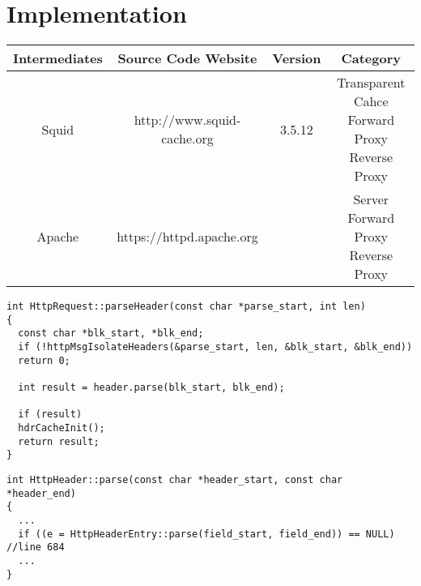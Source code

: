 \newpage
\section{Implementation}

\begin{table}[htbp!]
	\centering
	\renewcommand\arraystretch{1}
	\begin{tabular}{|c|c|c|c|}
		\hline 
		\textbf{ Intermediates} & \textbf{Source Code Website} & \textbf{Version} & \textbf{Category} \\ 
		\hline 
		\hline 
		Squid & http://www.squid-cache.org & 3.5.12 & \makecell{Transparent Cahce\\Forward Proxy\\Reverse Proxy} \\ 
		\hline 
		Apache & https://httpd.apache.org & &\makecell{Server\\ Forward Proxy\\ Reverse Proxy}\\
		\hline
	\end{tabular} 
\end{table}


\begin{lstlisting}[title= squid/src/HttpRequest.cc line:339]
int HttpRequest::parseHeader(const char *parse_start, int len)
{
  const char *blk_start, *blk_end;
  if (!httpMsgIsolateHeaders(&parse_start, len, &blk_start, &blk_end))
  return 0;

  int result = header.parse(blk_start, blk_end);

  if (result)
  hdrCacheInit();
  return result;
}
\end{lstlisting}

\begin{lstlisting}[title=squid/src/HttpHeader.cc line:588]
int HttpHeader::parse(const char *header_start, const char *header_end)
{
  ...
  if ((e = HttpHeaderEntry::parse(field_start, field_end)) == NULL) //line 684
  ...
}
\end{lstlisting}

